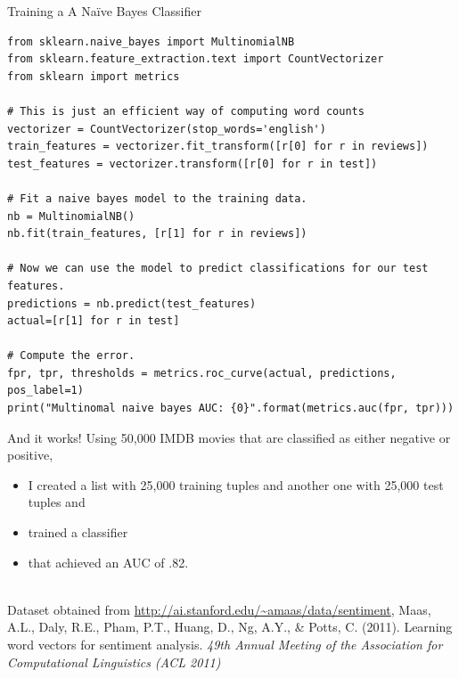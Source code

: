 \documentclass{beamer}
\begin{document}
\begin{frame}[fragile]{Training a A Naïve Bayes Classifier}
\begin{lstlisting}
from sklearn.naive_bayes import MultinomialNB
from sklearn.feature_extraction.text import CountVectorizer
from sklearn import metrics
 
# This is just an efficient way of computing word counts
vectorizer = CountVectorizer(stop_words='english')
train_features = vectorizer.fit_transform([r[0] for r in reviews])
test_features = vectorizer.transform([r[0] for r in test])
 
# Fit a naive bayes model to the training data.
nb = MultinomialNB()
nb.fit(train_features, [r[1] for r in reviews])
 
# Now we can use the model to predict classifications for our test features.
predictions = nb.predict(test_features)
actual=[r[1] for r in test]
 
# Compute the error.
fpr, tpr, thresholds = metrics.roc_curve(actual, predictions, pos_label=1)
print("Multinomal naive bayes AUC: {0}".format(metrics.auc(fpr, tpr)))

\end{lstlisting}
\end{frame}
%


\begin{frame}{And it works!}
Using 50,000 IMDB movies that are classified as either negative or positive,
\begin{itemize}
\item I created a list with 25,000 training tuples and another one with 25,000 test tuples and
\item trained a classifier
\item that achieved an AUC of .82.
\end{itemize}
~\\
\tiny{Dataset obtained from \url{http://ai.stanford.edu/~amaas/data/sentiment}, Maas, A.L., Daly, R.E., Pham, P.T., Huang, D., Ng, A.Y., \& Potts, C. (2011). Learning word vectors for sentiment analysis. \emph{49th Annual Meeting of the Association for Computational Linguistics (ACL 2011)}
}

\end{frame}
\end{document}
